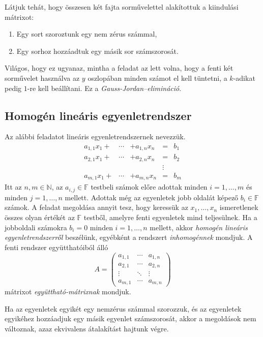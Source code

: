 \documentclass[9pt, showtrims]{memoir}
\theoremstyle{plain}
\theoremstyle{remark}
\theoremstyle{definition}
\begin{document}
Látjuk tehát, hogy összesen két fajta sorművelettel alakítottuk a kiindulási mátrixot:
\begin{enumerate}
    \item Egy sort szoroztunk egy nem zérus számmal,
    \item Egy sorhoz hozzáadtuk egy másik sor számszorosát.
\end{enumerate}
Világos, hogy ez ugyanaz, mintha a feladat az lett volna, 
hogy a fenti két sorművelet használva az $y$ oszlopában minden számot el kell tüntetni, 
a $k$-adikat pedig $1$-re kell beállítani.
Ez a \emph{Gauss-Jordan--elimináció}.

\subsection{Homogén lineáris egyenletrendszer}
Az alábbi feladatot lineáris egyenletrendszernek nevezzük.
\[
    \begin{array}{rrlcl}
        a_{1,1}x_1+&\cdots&+a_{1,n}x_n&=& b_1\\
        a_{2,1}x_1+&\cdots&+a_{2,n}x_n&=&b_2\\
        &&&\vdots&\\
        a_{m,1}x_1+&\cdots&+a_{m,n}x_n&=& b_m
    \end{array}
\]
Itt az $n,m\in\mathbb{N}$, az $a_{i,j}\in\mathbb{F}$ testbeli számok előre adottak
minden $i=1,\dots,m$ és minden $j=1,\dots,n$ mellett.
Adottak még az egyenletek jobb oldalát képező $b_i\in\mathbb{F}$ számok.
A feladat megoldása annyit tesz, hogy keressük az $x_1,\dots,x_n$ ismeretlenek 
összes olyan értékét az $\mathbb{F}$ testből,
amelyre fenti egyenletek mind teljesülnek.
Ha a jobboldali számokra $b_i=0$ minden $i=1,\dots,n$ mellett,
akkor 
\emph{homogén lineáris egyenletrendszerről}%
beszélünk,
egyébként a rendszert
\emph{inhomogénnek}%
mondjuk.
A fenti rendszer együtthatóiból álló
\[
    A=
    \begin{pmatrix}
        a_{1,1}&\cdots&a_{1,n}\\
        a_{2,1}&\cdots&a_{2,n}\\
        \vdots&\ddots&\vdots\\
        a_{m,1}&\cdots&a_{m,n}
    \end{pmatrix}
\]
mátrixot 
\emph{együttható-mátrixnak}%
mondjuk.

Ha az egyenletek egyikét egy nemzérus számmal szorozzuk,
és az egyenletek egyikéhez hozzáadjuk egy másik egyenlet számszorosát,
akkor a megoldások nem változnak, 
azaz ekvivalens átalakítást hajtunk végre.
\end{document}
